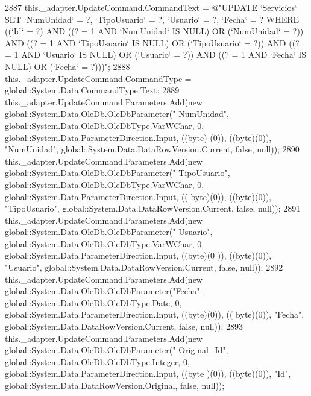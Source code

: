 \begin{DoxyCode}
2887             this.\_adapter.UpdateCommand.CommandText = \textcolor{stringliteral}{@"UPDATE `Servicios` SET `NumUnidad` = ?,
       `TipoUsuario` = ?, `Usuario` = ?, `Fecha` = ? WHERE ((`Id` = ?) AND ((? = 1 AND `NumUnidad` IS NULL) OR (`NumUnidad` =
       ?)) AND ((? = 1 AND `TipoUsuario` IS NULL) OR (`TipoUsuario` = ?)) AND ((? = 1 AND `Usuario` IS NULL) OR
       (`Usuario` = ?)) AND ((? = 1 AND `Fecha` IS NULL) OR (`Fecha` = ?)))"};
2888             this.\_adapter.UpdateCommand.CommandType = global::System.Data.CommandType.Text;
2889             this.\_adapter.UpdateCommand.Parameters.Add(\textcolor{keyword}{new} global::System.Data.OleDb.OleDbParameter(\textcolor{stringliteral}{"
      NumUnidad"}, global::System.Data.OleDb.OleDbType.VarWChar, 0, global::System.Data.ParameterDirection.Input, ((byte)
      (0)), ((byte)(0)), \textcolor{stringliteral}{"NumUnidad"}, global::System.Data.DataRowVersion.Current, \textcolor{keyword}{false}, null));
2890             this.\_adapter.UpdateCommand.Parameters.Add(\textcolor{keyword}{new} global::System.Data.OleDb.OleDbParameter(\textcolor{stringliteral}{"
      TipoUsuario"}, global::System.Data.OleDb.OleDbType.VarWChar, 0, global::System.Data.ParameterDirection.Input, ((
      byte)(0)), ((byte)(0)), \textcolor{stringliteral}{"TipoUsuario"}, global::System.Data.DataRowVersion.Current, \textcolor{keyword}{false}, null));
2891             this.\_adapter.UpdateCommand.Parameters.Add(\textcolor{keyword}{new} global::System.Data.OleDb.OleDbParameter(\textcolor{stringliteral}{"
      Usuario"}, global::System.Data.OleDb.OleDbType.VarWChar, 0, global::System.Data.ParameterDirection.Input, ((byte)(0
      )), ((byte)(0)), \textcolor{stringliteral}{"Usuario"}, global::System.Data.DataRowVersion.Current, \textcolor{keyword}{false}, null));
2892             this.\_adapter.UpdateCommand.Parameters.Add(\textcolor{keyword}{new} global::System.Data.OleDb.OleDbParameter(\textcolor{stringliteral}{"Fecha"}
      , global::System.Data.OleDb.OleDbType.Date, 0, global::System.Data.ParameterDirection.Input, ((byte)(0)), ((
      byte)(0)), \textcolor{stringliteral}{"Fecha"}, global::System.Data.DataRowVersion.Current, \textcolor{keyword}{false}, null));
2893             this.\_adapter.UpdateCommand.Parameters.Add(\textcolor{keyword}{new} global::System.Data.OleDb.OleDbParameter(\textcolor{stringliteral}{"
      Original\_Id"}, global::System.Data.OleDb.OleDbType.Integer, 0, global::System.Data.ParameterDirection.Input, ((byte
      )(0)), ((byte)(0)), \textcolor{stringliteral}{"Id"}, global::System.Data.DataRowVersion.Original, \textcolor{keyword}{false}, null));

\end{DoxyCode}
